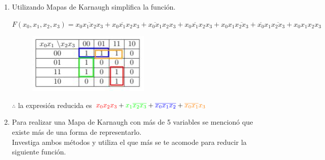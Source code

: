 \documentclass[a4paper,12pt]{article}
\begin{document}
\begin{enumerate}[label=\textcolor{teal}{\textbf{\arabic*.}}]
    \item Utilizando Mapas de Karnaugh simplifica la función.\\
    
        \begin{center}
            $F(x_0,x_1,x_2,x_3) =
            \overline{x_0 x_1 x_2 x_3} 
            +\overline{x_0 x_1 x_2} x_3
            +\overline{x_0 x_1} x_2 x_3
            +x_0 \overline{x_1} x_2 x_3
            + x_0 x_1 \overline{x_2 x_3}
            + \overline{x_0} x_1 \overline{x_2 x_3}
            +x_0 x_1 x_2 x_3
            $
        \end{center}
        
        \begin{figure}[H]
            \centering
            \includegraphics[width=5 cm]{img/mapa9.jpg}
        \end{figure}
        
        $ \therefore$ la expresión reducida es $\textcolor{red}{x_0 x_2 x_3} + \textcolor{green}{x_1 \overline{x_2 x_3}} + \textcolor{blue}{\overline{x_0 x_1 x_2}} + \textcolor{orange}{\overline{x_0 x_1} x_3}$

    \item Para realizar una Mapa de Karnaugh con más de 5 variables se mencionó que existe más de
    una forma de representarlo.\\
    Investiga ambos métodos y utiliza el que más se te acomode para reducir la siguiente función.


\end{enumerate}
\end{document}
